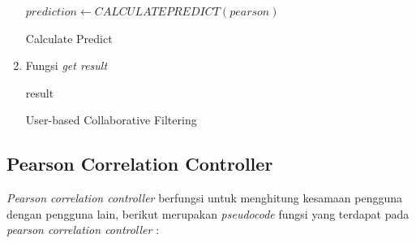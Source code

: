 \begin{enumerate}
        \begin{algorithm}[H]
            \begin{algorithmic}[1]
                    \State \Return $prediction \gets CALCULATEPREDICT(pearson)$
                \EndProcedure
            \end{algorithmic} 
            \caption{Calculate Predict}
            \label{alg:calculatePredict}
        \end{algorithm}
        
    \item Fungsi \textit{get result}\\
        
        \begin{algorithm}[H]
            \begin{algorithmic}[1]
                    \State \Return result
                \EndProcedure
            \end{algorithmic} 
            \caption{User-based Collaborative Filtering}
            \label{alg:getResult user-based}
        \end{algorithm}
    
\end{enumerate}

\subsection{Pearson Correlation Controller}
\label{subsec:pearson}

\textit{Pearson correlation controller} berfungsi untuk menghitung kesamaan pengguna dengan pengguna lain, berikut merupakan \textit{pseudocode} fungsi yang terdapat pada \textit{pearson correlation controller} :

